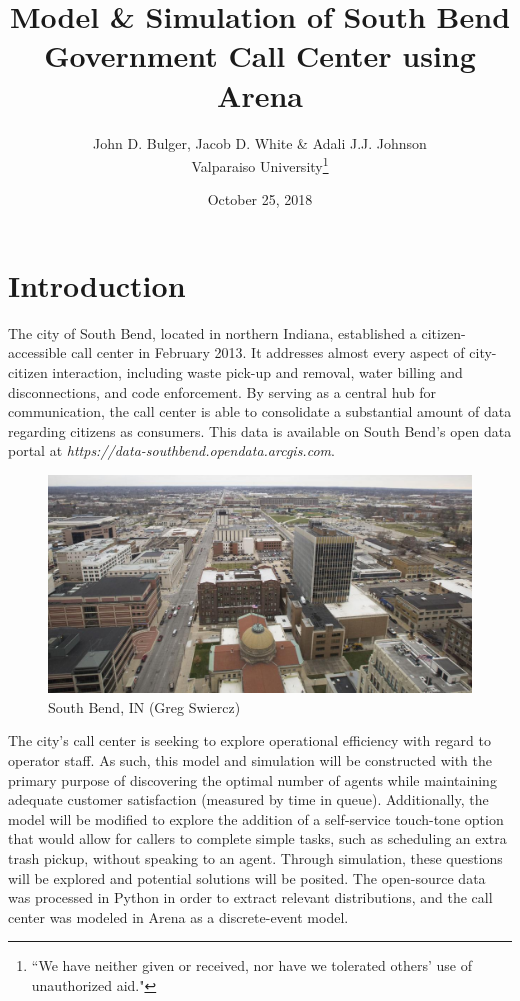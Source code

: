 \documentclass[12pt,twocolumn]{article}
\title{Model \& Simulation of South Bend Government Call Center using Arena}
\author{John D. Bulger, Jacob D. White \& Adali J.J. Johnson\\Valparaiso University\thanks{``We have neither given or received, nor have we tolerated others' use of unauthorized aid."}}
\date{October 25, 2018}
\begin{document}
\maketitle

\section{Introduction}
The city of South Bend, located in northern Indiana, established a citizen-accessible call center in February 2013.  It addresses almost every aspect of city-citizen interaction, including waste pick-up and removal, water billing and disconnections, and code enforcement.  By serving as a central hub for communication, the call center is able to consolidate a substantial amount of data regarding citizens as consumers.  This data is available on South Bend's open data portal at \textit{https://data-southbend.opendata.arcgis.com}.

	\begin{figure}[h]
	\includegraphics[scale=.17]{south_bend.png}
	\caption{South Bend, IN (Greg Swiercz)}
	\end{figure}

\par
The city's call center is seeking to explore operational efficiency with regard to operator staff.  As such, this model and simulation will be constructed with the primary purpose of discovering the optimal number of agents while maintaining adequate customer satisfaction (measured by time in queue).  Additionally, the model will be modified to explore the addition of a self-service touch-tone option that would allow for callers to complete simple tasks, such as scheduling an extra trash pickup, without speaking to an agent.  Through simulation, these questions will be explored and potential solutions will be posited.  The open-source data was processed in Python in order to extract relevant distributions, and the call center was modeled in Arena as a discrete-event model.  
\end{document}
